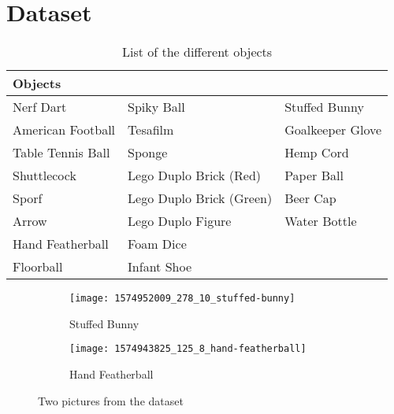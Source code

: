 \section{Dataset}
\label{sec:dataset}





\begin{table}[h]
  \caption{List of the different objects}
  \label{tab:objects}
  \centering
  \begin{tabular}{lll}
    \toprule
    \textbf{Objects} &  &  \\
    \midrule
	Nerf Dart & Spiky Ball & Stuffed Bunny \\
	American Football & Tesafilm & Goalkeeper Glove \\
	Table Tennis Ball & Sponge & Hemp Cord \\
	Shuttlecock & Lego Duplo Brick (Red) & Paper Ball \\
	Sporf & Lego Duplo Brick (Green) & Beer Cap \\
	Arrow & Lego Duplo Figure & Water Bottle \\
	Hand Featherball & Foam Dice &  \\
	Floorball & Infant Shoe &  \\
    \bottomrule
  \end{tabular}
\end{table}


\begin{figure}[ht]
  \centering
  \begin{subfigure}[b]{0.45\textwidth}
    \centering
    \texttt{[image: 1574952009\_278\_10\_stuffed-bunny]}
    \caption{Stuffed Bunny}
    \label{subfig:stuffed_bunny}
  \end{subfigure}
  \begin{subfigure}[b]{0.45\textwidth}
    \centering
    \texttt{[image: 1574943825\_125\_8\_hand-featherball]}
    \caption{Hand Featherball}
    \label{subfig:hand_featherball}
  \end{subfigure}
  \caption{Two pictures from the dataset}
  \label{fig:dataset}
\end{figure}

